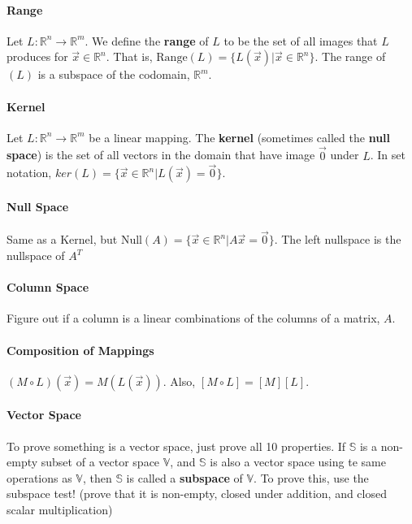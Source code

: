 \documentclass[10pt,letter]{article}
\begin{document}
\paragraph{Range} Let $L:\mathbb{R}^n\rightarrow\mathbb{R}^m$. We define the \textbf{range} of $L$ to be the set of all images that $L$ produces for $\vec{x}\in\mathbb{R}^n$. That is, $\text{Range}(L)=\{L(\vec{x})|\vec{x}\in\mathbb{R}^n\}$. The range of $(L)$ is a subspace of the codomain, $\mathbb{R}^m$. 

\paragraph{Kernel} Let $L:\mathbb{R}^n\rightarrow\mathbb{R}^m$ be a linear mapping. The \textbf{kernel} (sometimes called the \textbf{null space}) is the set of all vectors in the domain that have image $\vec{0}$ under $L$. In set notation, $ker(L)=\{\vec{x}\in\mathbb{R}^n|L(\vec{x})=\vec{0}\}$.

\paragraph{Null Space} Same as a Kernel, but Null$(A)=\{\vec{x}\in\mathbb{R}^n|A\vec{x}=\vec{0}\}$. The left nullspace is the nullspace of $A^T$

\paragraph{Column Space} Figure out if a column is a linear combinations of the columns of a matrix, $A$. 

\paragraph{Composition of Mappings} $(M\circ L)(\vec{x})=M(L(\vec{x}))$. Also, $[M\circ L]=[M][L]$. 

\paragraph{Vector Space} To prove something is a vector space, just prove all 10 properties. If $\mathbb{S}$ is a non-empty subset of a vector space $\mathbb{V}$, and $\mathbb{S}$ is also a vector space using te same operations as $\mathbb{V}$, then $\mathbb{S}$ is called a \textbf{subspace} of $\mathbb{V}$. To prove this, use the subspace test! (prove that it is non-empty, closed under addition, and closed scalar multiplication)
\end{document}
